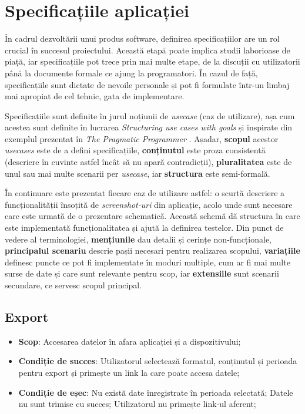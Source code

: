 \chapter{Specificațiile aplicației}\label{specs}

În cadrul dezvoltării unui produs software, definirea specificațiilor are un rol crucial în succesul proiectului. Această etapă poate implica studii laborioase de piață, iar specificațiile pot trece prin mai multe etape, de la discuții cu utilizatorii până la documente formale ce ajung la programatori. În cazul de față, specificațiile sunt dictate de nevoile personale și pot fi formulate într-un limbaj mai apropiat de cel tehnic, gata de implementare.

Specificațiile sunt definite în jurul noțiunii de \emph{usecase} (caz de utilizare), așa cum acestea sunt definite în lucrarea \emph{Structuring use cases with goals} \cite{cockburn1997structuring} și inspirate din exemplul prezentat în \emph{The Pragmatic Programmer} \cite{Hunt:2000:PPJ:320326}. Așadar, \textbf{scopul} acestor \emph{usecases} este de a defini specificațiile, \textbf{conținutul} este proza consistentă (descriere în cuvinte astfel încât să nu apară contradicții), \textbf{pluralitatea} este de unul sau mai multe scenarii per \emph{usecase}, iar \textbf{structura} este semi-formală.

În continuare este prezentat fiecare caz de utilizare astfel: o scurtă descriere a funcționalității însoțită de \emph{screenshot-uri} din aplicație, acolo unde sunt necesare care este urmată de o prezentare schematică. Această schemă dă structura în care este implementată funcționalitatea și ajută la definirea testelor. Din punct de vedere al terminologiei, \textbf{mențiunile} dau detalii și cerințe non-funcționale, \textbf{principalul scenariu} descrie pașii necesari pentru realizarea scopului, \textbf{variațiile} definesc puncte ce pot fi implementate în moduri multiple, cum ar fi mai multe surse de date și care sunt relevante pentru scop, iar \textbf{extensiile} sunt scenarii secundare, ce servesc scopul principal.






\section{Export}\label{export}

\begin{itemize}
\item
  \textbf{Scop}: Accesarea datelor în afara aplicației și a dispozitivului;
\item
  \textbf{Condiție de succes}: Utilizatorul selectează formatul, conținutul și perioada pentru export și primește un link la care poate accesa datele;
\item
  \textbf{Condiție de eșec}: Nu există date înregistrate în perioada selectată; Datele nu sunt trimise cu succes; Utilizatorul nu primește link-ul aferent;
\end{itemize}

